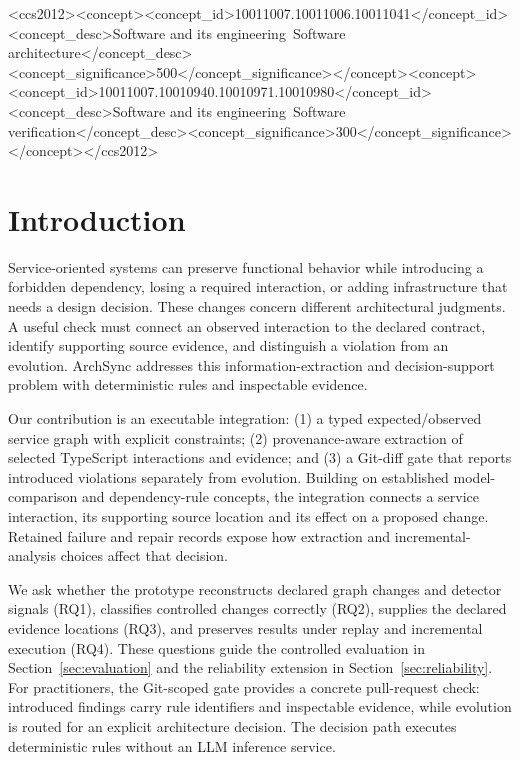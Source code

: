 \begin{CCSXML}
<ccs2012><concept><concept_id>10011007.10011006.10011041</concept_id><concept_desc>Software and its engineering~Software architecture</concept_desc><concept_significance>500</concept_significance></concept><concept><concept_id>10011007.10010940.10010971.10010980</concept_id><concept_desc>Software and its engineering~Software verification</concept_desc><concept_significance>300</concept_significance></concept></ccs2012>
\end{CCSXML}
\maketitle

\section{Introduction}
Service-oriented systems can preserve functional behavior while introducing a forbidden dependency, losing a required interaction, or adding infrastructure that needs a design decision. These changes concern different architectural judgments. A useful check must connect an observed interaction to the declared contract, identify supporting source evidence, and distinguish a violation from an evolution. ArchSync addresses this information-extraction and decision-support problem with deterministic rules and inspectable evidence.

\begin{sloppypar}
Our contribution is an executable integration: (1) a typed expected/observed service graph with explicit constraints; (2) provenance-aware extraction of selected TypeScript interactions and evidence; and (3) a Git-diff gate that reports introduced violations separately from evolution. Building on established model-comparison and dependency-rule concepts, the integration connects a service interaction, its supporting source location and its effect on a proposed change. Retained failure and repair records expose how extraction and incremental-analysis choices affect that decision.
\end{sloppypar}

\begin{sloppypar}
We ask whether the prototype reconstructs declared graph changes and detector signals (RQ1), classifies controlled changes correctly (RQ2), supplies the declared evidence locations (RQ3), and preserves results under replay and incremental execution (RQ4). These questions guide the controlled evaluation in Section~\ref{sec:evaluation} and the reliability extension in Section~\ref{sec:reliability}. For practitioners, the Git-scoped gate provides a concrete pull-request check: introduced findings carry rule identifiers and inspectable evidence, while evolution is routed for an explicit architecture decision. The decision path executes deterministic rules without an LLM inference service.
\end{sloppypar}

